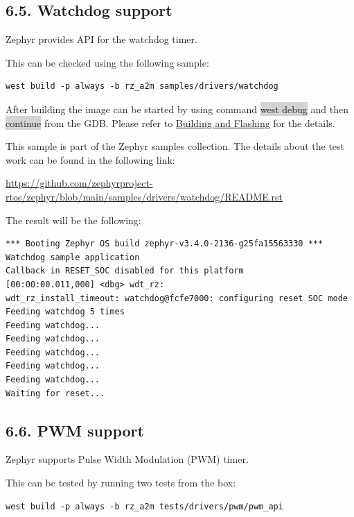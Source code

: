 \documentclass[11pt,a4paper,oneside]{article}
\begin{document}
\subsection*{6.5. Watchdog support}\label{watchdog-support}

Zephyr provides API for the watchdog timer.

This can be checked using the following sample:

\begin{lstlisting}
west build -p always -b rz_a2m samples/drivers/watchdog
\end{lstlisting}

After building the image can be started by using command \colorbox{lightgray}{west debug}
and then \colorbox{lightgray}{continue} from the GDB. Please refer to
\hyperref[building-and-flashing]{Building and Flashing} for the
details.

This sample is part of the Zephyr samples collection. The details about
the test work can be found in the following link:

\url{https://github.com/zephyrproject-rtos/zephyr/blob/main/samples/drivers/watchdog/README.rst}

The result will be the following:

\begin{lstlisting}
*** Booting Zephyr OS build zephyr-v3.4.0-2136-g25fa15563330 ***
Watchdog sample application
Callback in RESET_SOC disabled for this platform
[00:00:00.011,000] <dbg> wdt_rz:
wdt_rz_install_timeout: watchdog@fcfe7000: configuring reset SOC mode
Feeding watchdog 5 times
Feeding watchdog...
Feeding watchdog...
Feeding watchdog...
Feeding watchdog...
Feeding watchdog...
Waiting for reset...
\end{lstlisting}

\subsection*{6.6. PWM support}\label{pwm-support}

Zephyr supports Pulse Width Modulation (PWM) timer.

This can be tested by running two tests from the box:

\begin{lstlisting}
west build -p always -b rz_a2m tests/drivers/pwm/pwm_api
\end{lstlisting}
\end{document}

